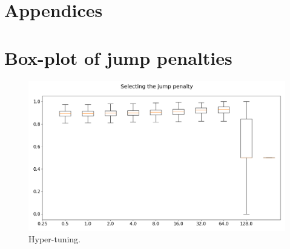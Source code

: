 \newpage
\section{Appendices}
\appendix

\section{Box-plot of jump penalties}
\label{appendix:box_plot}

\begin{figure}[H] 
    \centering
    \includegraphics[width=1\textwidth]{analysis/model_convergence/images/jump_penalties_box.png}
    \caption{Hyper-tuning.}
\end{figure}
